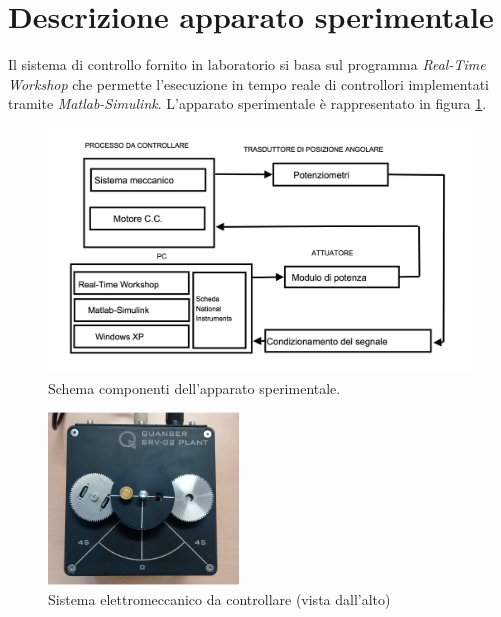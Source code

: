 \section{Descrizione apparato sperimentale}	
\label{sec:DEscrizioneApparatoSperimentale}

	Il sistema di controllo fornito in laboratorio si basa sul programma \textit{Real-Time Workshop} che permette l'esecuzione in tempo reale di controllori implementati tramite \textit{Matlab-Simulink}. L'apparato sperimentale è rappresentato in figura \ref{fig:apparatoSperimentale}.
	
	\begin{figure}[H]
		\centering
		\includegraphics[width=.9\textwidth]{./figure/apparato_sperimentale}
		\caption{Schema componenti dell'apparato sperimentale.}
		\label{fig:apparatoSperimentale}
	\end{figure}
	
	\begin{figure}[H]
		\centering
		\includegraphics[width=0.45\textwidth]{./figure/motore}
		\caption{Sistema elettromeccanico da controllare (vista dall'alto)}
		\label{fig:fotoMotore}
	\end{figure}
	
